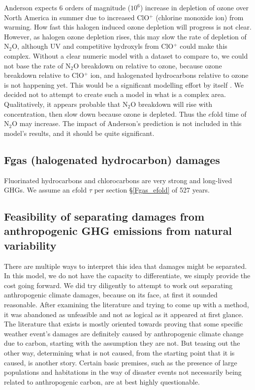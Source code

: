 \documentclass{article}
\begin{document}
Anderson expects 6 orders of magnitude ($10^6$) increase in depletion of ozone over North America in summer due to increased ClO$^+$ (chlorine monoxide ion) from warming. How fast this halogen induced ozone depletion will progress is not clear. However, as halogen ozone depletion rises, this may slow the rate of depletion of N$_2$O, although UV and competitive hydroxyls from ClO$^+$ could make this complex.  Without a clear numeric model with a dataset to compare to, we could not base the rate of N$_2$O breakdown on relative to ozone, because ozone breakdown relative to ClO$^+$ ion, and halogenated hydrocarbons relative to ozone is not happening yet. This would be a significant modelling effort by itself \cite{Anderson2018CouplingCatalysis,Anderson2017ChlorineBromineCatalysis}. We decided not to attempt to create such a model in what is a complex area. Qualitatively, it appears probable that N$_2$O breakdown will rise with concentration, then slow down because ozone is depleted. Thus the $e$fold time of N$_2$O may increase. The impact of Anderson's prediction is not included in this model's results, and it should be quite significant. 

\subsection{Fgas (halogenated hydrocarbon) damages}
\label{Fgas_damages}
Fluorinated hydrocarbons and chlorocarbons are very strong and long-lived GHGs. We assume an $e$fold $\tau$ per section \S\ref{Fgas_efold} of 527 years.   

\subsection{Feasibility of separating damages from anthropogenic GHG emissions from natural variability}
\label{AnthroGHGdifferentiation}
There are multiple ways to interpret this idea that damages might be separated. In this model, we do not have the capacity to differentiate, we simply provide the cost going forward. We did try diligently to attempt to work out separating anthropogenic climate damages, because on its face, at first it sounded reasonable. After examining the literature and trying to come up with a method, it was abandoned as unfeasible and not as logical as it appeared at first glance. The literature that exists is mostly oriented towards proving that some specific weather event’s damages are definitely caused by anthropogenic climate change due to carbon, starting with the assumption they are not. But teasing out the other way, determining what is not caused, from the starting point that it is caused, is another story.  Certain basic premises, such as the presence of large populations and habitations in the way of disaster events not necessarily being related to anthropogenic carbon, are at best highly questionable. 
\end{document}
